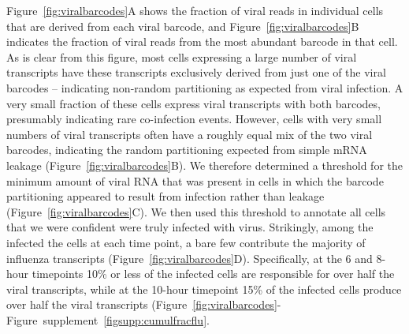 \documentclass[9pt,lineno]{elife}
\begin{document}
Figure~\ref{fig:viralbarcodes}A shows the fraction of viral reads in individual cells that are derived from each viral barcode, and Figure~\ref{fig:viralbarcodes}B indicates the fraction of viral reads from the most abundant barcode in that cell.
As is clear from this figure, most cells expressing a large number of viral transcripts have these transcripts exclusively derived from just one of the viral barcodes -- indicating non-random partitioning as expected from viral infection.
A very small fraction of these cells express viral transcripts with both barcodes, presumably indicating rare co-infection events.
However, cells with very small numbers of viral transcripts often have a roughly equal mix of the two viral barcodes, indicating the random partitioning expected from simple mRNA leakage (Figure~\ref{fig:viralbarcodes}B).
We therefore determined a threshold for the minimum amount of viral RNA that was present in cells in which the barcode partitioning appeared to result from infection rather than leakage (Figure~\ref{fig:viralbarcodes}C).
We then used this threshold to annotate all cells that we were confident were truly infected with virus.
Strikingly, among the infected the cells at each time point, a bare few contribute the majority of influenza transcripts (Figure~\ref{fig:viralbarcodes}D).
Specifically, at the 6 and 8-hour timepoints 10\% or less of the infected cells are responsible for over half the viral transcripts, while at the 10-hour timepoint 15\% of the infected cells produce over half the viral transcripts (Figure~\ref{fig:viralbarcodes}-Figure~supplement~\ref{figsupp:cumulfracflu}.
\end{document}
